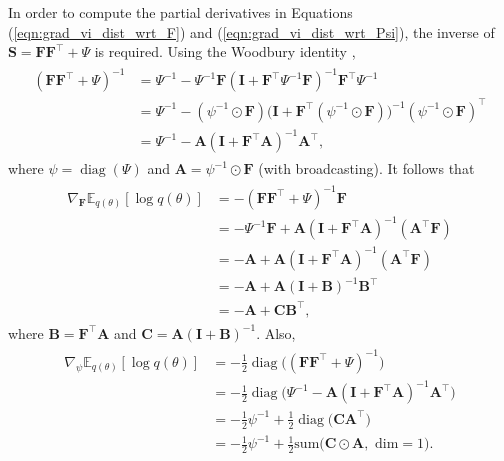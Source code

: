 \documentclass[msc,deptreport.inf]{infthesis} %
\newcommand{\matr}[1]{\mathbf{#1}}
\newcommand{\E}{\mathbb E}
\newcommand{\diag}{\mathop{\mathrm{diag}}}
\begin{document}
In order to compute the partial derivatives in Equations (\ref{eqn:grad_vi_dist_wrt_F}) and (\ref{eqn:grad_vi_dist_wrt_Psi}), the inverse of $\matr{S} = \matr{FF}^{\intercal} + \Psi$ is required. Using the Woodbury identity \cite{petersen2012},
\begin{align}
\begin{split}
	( \matr{FF}^{\intercal} + \Psi)^{-1}
	& = \Psi^{-1} - \Psi^{-1}\matr{F}(\matr{I} + \matr{F}^\intercal \Psi^{-1} \matr{F})^{-1} \matr{F}^\intercal \Psi^{-1} \\
	& = \Psi^{-1} - (\psi^{-1} \odot \matr{F}) \big(\matr{I} + \matr{F}^\intercal (\psi^{-1} \odot \matr{F})\big)^{-1} (\psi^{-1} \odot \matr{F})^\intercal \\
	& = \Psi^{-1} - \matr{A} (\matr{I} + \matr{F}^\intercal \matr{A})^{-1} \matr{A}^\intercal,
\end{split}
\end{align}
where $\psi = \diag(\Psi)$ and $\matr{A} = \psi^{-1} \odot \matr{F}$ (with broadcasting). It follows that
\begin{align}
\begin{split}
	\nabla_\matr{F} \E_{q(\theta)} [\log q(\theta)]
	& = -( \matr{FF}^{\intercal} + \Psi)^{-1}\matr{F} \\
	& = -\Psi^{-1} \matr{F}  + \matr{A}  (\matr{I} + \matr{F}^\intercal \matr{A})^{-1} (\matr{A}^\intercal \matr{F}) \\
	& = -\matr{A}  + \matr{A} (\matr{I} + \matr{F}^\intercal \matr{A})^{-1} (\matr{A}^\intercal \matr{F}) \\
	& = -\matr{A}  + \matr{A} (\matr{I} + \matr{B})^{-1} \matr{B}^\intercal \\
	& = -\matr{A}  + \matr{C} \matr{B}^\intercal,
\end{split}
\end{align}
where $\matr{B} = \matr{F}^\intercal \matr{A}$ and $\matr{C} = \matr{A} (\matr{I} + \matr{B})^{-1}$. Also,
\begin{align}
\begin{split}
	\nabla_\psi \E_{q(\theta)} [\log q(\theta)]
	& = -\frac{1}{2} \diag\big( ( \matr{FF}^{\intercal} + \Psi)^{-1}\big) \\
	& = -\frac{1}{2}\diag\big(\Psi^{-1}  - \matr{A}  (\matr{I} + \matr{F}^\intercal \matr{A})^{-1} \matr{A}^\intercal \big) \\
	& = -\frac{1}{2}\psi^{-1} + \frac{1}{2} \diag\big(\matr{C} \matr{A}^\intercal \big) \\
	& = -\frac{1}{2}\psi^{-1} + \frac{1}{2} \text{sum}\big(\matr{C} \odot \matr{A}, \text{ dim} = 1\big).
\end{split}
\end{align}
\end{document}

